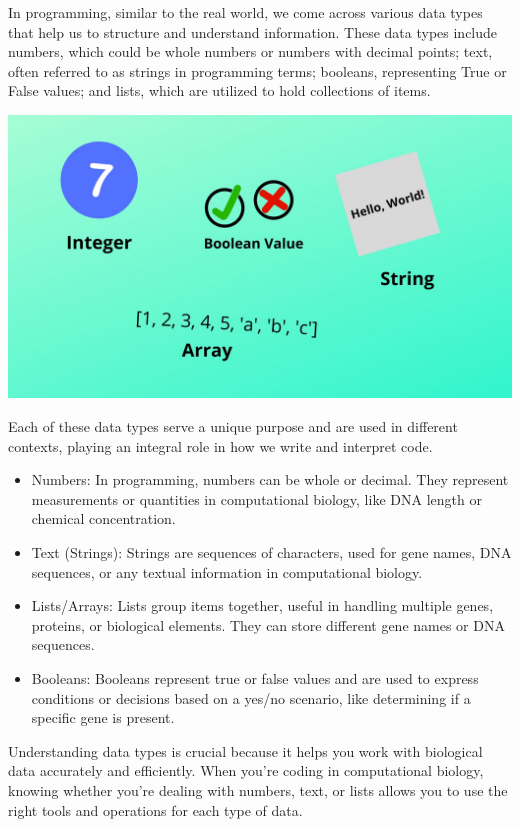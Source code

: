 \documentclass[
]{book}
\begin{document}
In programming, similar to the real world, we come across various data types that help us to structure and understand information. These data types include numbers, which could be whole numbers or numbers with decimal points; text, often referred to as strings in programming terms; booleans, representing True or False values; and lists, which are utilized to hold collections of items.

\includegraphics{images/datatype.jpeg}

Each of these data types serve a unique purpose and are used in different contexts, playing an integral role in how we write and interpret code.

\begin{itemize}
\item
  Numbers: In programming, numbers can be whole or decimal. They represent measurements or quantities in computational biology, like DNA length or chemical concentration.
\item
  Text (Strings): Strings are sequences of characters, used for gene names, DNA sequences, or any textual information in computational biology.
\item
  Lists/Arrays: Lists group items together, useful in handling multiple genes, proteins, or biological elements. They can store different gene names or DNA sequences.
\item
  Booleans: Booleans represent true or false values and are used to express conditions or decisions based on a yes/no scenario, like determining if a specific gene is present.
\end{itemize}

Understanding data types is crucial because it helps you work with biological data accurately and efficiently. When you're coding in computational biology, knowing whether you're dealing with numbers, text, or lists allows you to use the right tools and operations for each type of data.
\end{document}
